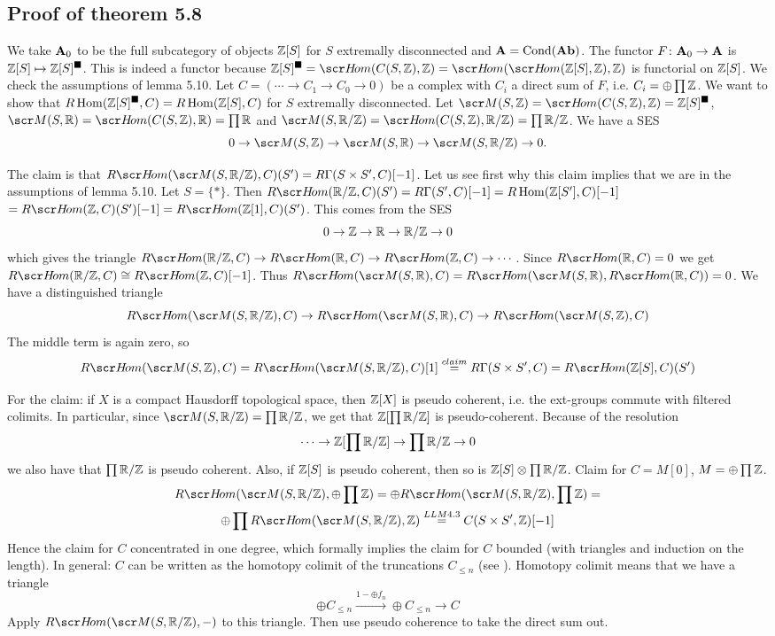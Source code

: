\documentclass[A4paper, british, reqno]{amsart}
\theoremstyle{darkgreentheorem}
\theoremstyle{darkbluedefinition}
\theoremstyle{darkredexample}
\theoremstyle{remark}
\DeclareMathOperator{\Hom}{Hom}
\DeclareMathOperator{\Cond}{Cond}
\newcommand{\1}{\mathbbm{1}}
\newcommand{\ot}{\otimes}
\newcommand{\op}{\oplus}
\newcommand{\tms}{\times}
\newcommand{\solid}{^{\blacksquare}}
\begin{document}
\subsection{Proof of theorem 5.8}

We take $\mathbf{A}_{0}$ to be the full subcategory of objects $\mathbb{Z}[S]$ for $S$ extremally disconnected and $\bfA=\Cond(\Ab)$.
The functor $F\colon \mathbf{A}_{0}\to \mathbf{A}$ is $\Z[S]\mapsto \Z[S]\solid$.
This is indeed a functor because $\Z[S]\solid=\hom(C(S,\Z),\Z)=\hom(\hom(\Z[S],\Z),\Z)$ is functorial on $\mathbb{Z}[S]$.
We check the assumptions of lemma 5.10.
Let $C=(\cdots \to C_{1}\to C_{0}\to 0)$ be a complex with $C_{i}$ a direct sum of $F$, i.e. $C_{i}=\op \prod \Z$.
We want to show that $R\Hom(\Z[S]\solid,C)=R\Hom(\Z[S],C)$ for $S$ extremally disconnected.
Let $\M(S,\Z)=\hom(C(S,\Z),\Z)=\Z[S]\solid$, $\M(S,\R)=\hom(C(S,\Z),\R)=\prod \R$ and $\M(S,\R/\Z)=\hom(C(S,\Z),\R/\Z)=\prod \R/\Z$.
We have a SES
\[ 0\to \M(S,\Z)\to \M(S,\R)\to \M(S,\R/\Z)\to 0.\]

The claim is that $R\hom(\M(S,\R/\Z),C)(S')=R\Gamma (S\tms S',C)[-1]$.
Let us see first why this claim implies that we are in the assumptions of lemma 5.10.
Let $S=\{*\}$.
Then $R\hom(\R/\Z,C)(S')=R\Gamma(S',C)[-1]=R\Hom(\Z[S'],C)[-1]$$=R\hom(\Z,C)(S')[-1]=R\hom(\Z[1],C)(S')$.
This comes from the SES
\[ 0\to \mathbb{Z}\to \mathbb{R}\to \mathbb{R}/\mathbb{Z}\to 0 \]
which gives the triangle $R\hom(\R/\Z,C)\to R\hom(\R,C)\to R\hom(\Z,C)\to \cdots$.
Since $R\hom(\R,C)=0$ we get $R\hom(\R/\Z,C)\cong R\hom(\Z,C)[-1]$.
Thus $R\hom(\M(S,\R),C)=R\hom(\M(S,\R),R\hom(\R,C))=0$.
We have a distinguished triangle
\[ R\hom(\M(S,\R/\Z),C)\to R\hom(\M(S,\R),C)\to R\hom(\M(S,\Z),C) \]
The middle term is again zero, so
\[ R\hom(\M(S,\Z),C)=R\hom(\M(S,\R/\Z),C)[1]\overset{claim}{=} R\Gamma(S\tms S',C)=R\hom(\Z[S],C)(S')\]

For the claim: if $X$ is a compact Hausdorff topological space, then $\mathbb{Z}[X]$ is pseudo coherent, i.e. the ext-groups commute with filtered colimits.
In particular, since $\M(S,\R/\Z)=\prod \R/\Z$, we get that $\mathbb{Z}[\prod \mathbb{R}/\mathbb{Z}]$ is pseudo-coherent.
Because of the resolution
\[ \cdots \to \mathbb{Z}[\prod \mathbb{R}/\mathbb{Z}]\to \prod \mathbb{R}/\mathbb{Z}\to 0\]
we also have that $\prod \mathbb{R}/\mathbb{Z}$ is pseudo coherent.
Also, if $\mathbb{Z}[S]$ is pseudo coherent, then so is $\Z[S]\ot \prod \R/\Z$.
Claim for $C=M[0]$, $M=\op \prod \Z$.
\begin{multline*}
    R\hom(\M(S,\R/\Z),\op \prod \Z)=\op R\hom(\M(S,\R/\Z),\prod \Z) =\\
    \op \prod R\hom(\M(S,\R/\Z),\Z) \overset{LLM 4.3}{=} C(S\tms S',\Z)[-1]
\end{multline*}
Hence the claim for $C$ concentrated in one degree, which formally implies the claim for $C$ bounded (with triangles and induction on the length).
In general: $C$ can be written as the homotopy colimit of the truncations $C_{\leqslant n}$ (see \cite[Tag 093W]{sta19}).
Homotopy colimit means that we have a triangle
\[ \op C_{\leqslant n} \xrightarrow{1-\op f_{n}}\op C_{\leqslant n}\to C \]
Apply $R\hom(\M(S,\R/\Z),-)$ to this triangle.
Then use pseudo coherence to take the direct sum out.
\end{document}
